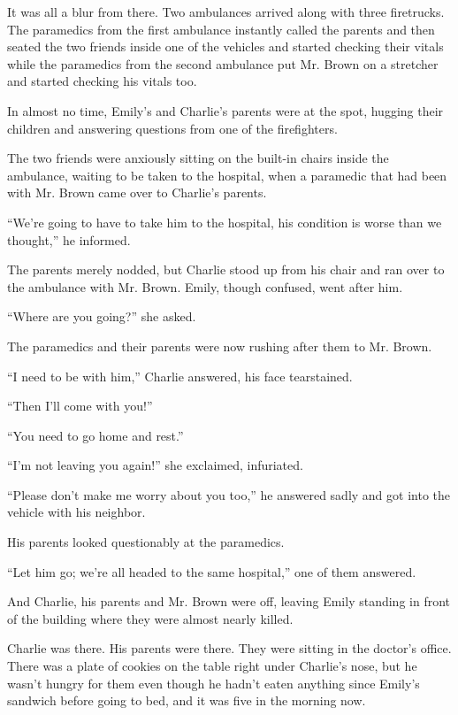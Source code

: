 It was all a blur from there. Two ambulances arrived along with three firetrucks. The paramedics from the first ambulance instantly called the parents and then seated the two friends inside one of the vehicles and started checking their vitals while the paramedics from the second ambulance put Mr. Brown on a stretcher and started checking his vitals too.

In almost no time, Emily's and Charlie's parents were at the spot, hugging their children and answering questions from one of the firefighters.

The two friends were anxiously sitting on the built-in chairs inside the ambulance, waiting to be taken to the hospital, when a paramedic that had been with Mr. Brown came over to Charlie's parents.

“We're going to have to take him to the hospital, his condition is worse than we thought,” he informed.

The parents merely nodded, but Charlie stood up from his chair and ran over to the ambulance with Mr. Brown. Emily, though confused, went after him.

“Where are you going?” she asked.

The paramedics and their parents were now rushing after them to Mr. Brown.

“I need to be with him,” Charlie answered, his face tearstained.

“Then I'll come with you!”

“You need to go home and rest.”

“I'm not leaving you again!” she exclaimed, infuriated.

“Please don't make me worry about you too,” he answered sadly and got into the vehicle with his neighbor.

His parents looked questionably at the paramedics.

“Let him go; we're all headed to the same hospital,” one of them answered.

And Charlie, his parents and Mr. Brown were off, leaving Emily standing in front of the building where they were almost nearly killed.

\bigskip

Charlie was there. His parents were there. They were sitting in the doctor's office. There was a plate of cookies on the table right under Charlie's nose, but he wasn't hungry for them even though he hadn't eaten anything since Emily's sandwich before going to bed, and it was five in the morning now.

